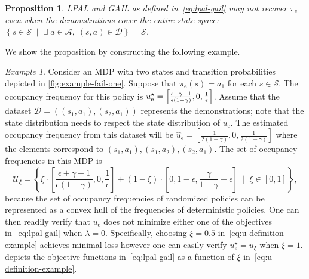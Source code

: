 \documentclass[10pt]{article}
\theoremstyle{plain}
\newtheorem{proposition}{Proposition}
\theoremstyle{remark}
\newtheorem{example}{Example}
\newcommand{\mm}[1]{\textcolor{magenta}{[#1]}}
\newcommand{\gersi}[1]{\textcolor{red}{[#1]}}
\begin{document}
\begin{proposition}
LPAL and GAIL as defined in~\eqref{eq:lpal-gail} may not recover $\pi_{\mathrm{e}}$ even when the demonstrations cover the entire state space: $ \left\{ s\in \mathcal{S} \; \mid \; \exists\; a\in \mathcal{A}, \; (s,a) \in \mathcal{D} \right\} = \mathcal{S}$. 
\end{proposition}
We show the proposition by constructing the following example.
\begin{example} \label{exm:fail-all}
Consider an MDP with two states and transition probabilities depicted in \cref{fig:example-fail-one}. Suppose that $\pi_{\mathrm{e}}(s) = a_1$ for each $s\in \mathcal{S}$.  The occupancy frequency for this policy is $u^{\mathnormal{\star}}_{\mathrm{e}} = \left[ \frac{\epsilon + \gamma - 1}{\epsilon(1-\gamma)}, 0, \frac{1}{\epsilon}\right]$. Assume that the dataset $\mathcal{D} = ( (s_1, a_1), (s_2, a_1) )$ represents the demonstrations; note that the state distribution needs to respect the state distribution of $u_{\mathrm{e}}$. The estimated occupancy frequency from this dataset will be $\hat{u}_{\mathrm{e}} = \left[\frac{1}{2(1-\gamma)}, 0, \frac{1}{2(1-\gamma)}\right]$ where the elements correspond to $(s_1, a_1), (s_1, a_2), (s_2,a_1)$. The set of occupancy frequencies in this MDP is
\begin{equation} \label{eq:u-definition-example}
  \mathcal{U}_\xi = \left\{ \xi \cdot \left[\frac{\epsilon+\gamma-1}{\epsilon(1-\gamma)}, 0, \frac{1}{\epsilon}\right] + (1-\xi) \cdot \left[0,1-\epsilon,\frac{\gamma}{1-\gamma}+\epsilon\right] \;\mid\; \xi \in [0,1]\right\},
\end{equation}
because the set of occupancy frequencies of randomized policies can be represented as a convex hull of the frequencies of deterministic policies. One can then readily verify that $u_{\mathrm{e}}$ does not minimize either one of the objectives in~\eqref{eq:lpal-gail} when $\lambda = 0$. Specifically, choosing $\xi = 0.5$ in~\eqref{eq:u-definition-example} achieves minimal loss however one can easily verify $u^\star_e = u_\xi$ when $\xi = 1$.  depicts the objective functions in~\eqref{eq:lpal-gail} as a function of $\xi$ in~\eqref{eq:u-definition-example}.
\end{example}
\end{document}
